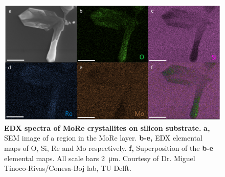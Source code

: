 \begin{figure}
	\centering
	\includegraphics[width=\linewidth]{chapter-experimental-methods/figs-fabrication/pics/MoRe_EDX}
	\caption{
	\textbf{EDX spectra of MoRe crystallites on silicon substrate.}
	\textbf{a,} SEM image of a region in the MoRe layer.
	\textbf{b-e,} EDX elemental maps of O, Si, Re and Mo respectively.
	\textbf{f,} Superposition of the \textbf{b-e} elemental maps.
	All scale bars \SI{2}{\micro\meter}.
	Courtesy of Dr. Miguel Tinoco-Rivas/Conesa-Boj lab, TU Delft.
	}
	\label{fig:moreedx}
\end{figure}